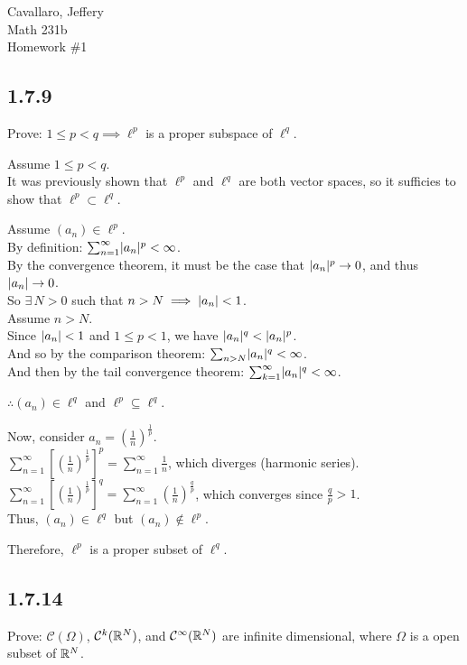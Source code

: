 \documentclass[letterpaper,12pt,fleqn]{article}
\newcommand{\mc}{\mathcal{C}}
\renewcommand{\O}{\Omega}
\begin{document}
Cavallaro, Jeffery \\
Math 231b \\
Homework \#1

\subsection*{1.7.9}

Prove: $1\le p<q\implies\ell^p$ is a proper subspace of $\ell^q$.

Assume $1\le p<q$. \\
It was previously shown that $\ell^p$ and $\ell^q$ are both vector spaces,
so it sufficies to show that $\ell^p\subset\ell^q$.

Assume $(a_n)\in\ell^p$. \\
By definition: $\sum_{n=1}^{\infty}\lvert a_n\rvert^p<\infty$. \\
By the convergence theorem, it must be the case that $\lvert a_n\rvert^p\to0$, and
thus $\lvert a_n\rvert\to0$. \\
So $\exists\,N>0$ such that $n>N\implies\lvert a_n\rvert<1$. \\
Assume $n>N$. \\
Since $\lvert a_n\rvert<1$ and $1\le p<1$, we have $\lvert a_n\rvert^q<\lvert a_n\rvert^p$. \\
And so by the comparison theorem: $\sum_{n>N}\lvert a_n\rvert^q<\infty$. \\
And then by the tail convergence theorem:
$\sum_{k=1}^{\infty}\lvert a_n\rvert^q<\infty$.

$\therefore (a_n)\in\ell^q$ and $\ell^p\subseteq\ell^q$.

Now, consider $a_n=\left(\frac{1}{n}\right)^{\frac{1}{p}}$. \\
$\sum_{n=1}^{\infty}\left[\left(\frac{1}{n}\right)^{\frac{1}{p}}\right]^p=
\sum_{n=1}^{\infty}\frac{1}{n}$, which diverges (harmonic series). \\
$\sum_{n=1}^{\infty}\left[\left(\frac{1}{n}\right)^{\frac{1}{p}}\right]^q=
\sum_{n=1}^{\infty}\left(\frac{1}{n}\right)^{\frac{q}{p}}$, which converges since
$\frac{q}{p}>1$. \\
Thus, $(a_n)\in\ell^q$ but $(a_n)\notin\ell^p$.

Therefore, $\ell^p$ is a proper subset of $\ell^q$.

\subsection*{1.7.14}

Prove: $\mc(\O)$, $\mc^k(\R^N)$, and $\mc^{\infty}(\R^N)$ are infinite
dimensional, where $\O$ is a open subset of $\mathbb{R}^N$.
\end{document}
